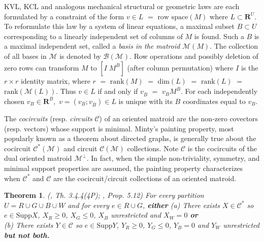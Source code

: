 \documentclass{amsproc-sunycstr}
\def\Reals{\ensuremath{\mathbf R}}
\theoremstyle{plain}
\newtheorem{theorem}{Theorem}
\theoremstyle{definition}
\theoremstyle{remark}
\newcommand{\hmat}[2]{[#1\;#2]}
\newcommand{\extra}[1]{{{#1}}}
\begin{document}
KVL, KCL and analogous mechanical structural or geometric laws 
are each formulated by a constraint of the form 
$v\in L$ $=$ $\mbox{row space}(M)$
where $L\subset\Reals^U$.  To
reformulate this law by a system of linear equations,
a maximal subset $B\subset U$ corresponding to
a linearly independent set of columns of $M$ is found.  Such a $B$ is
a maximal independent set,
called a \textit{basis in the matroid} $\mathcal{M}(M)$.
The collection of all bases in $\mathcal{M}$ is denoted by 
$\mathcal{B}(\mathcal{M})$.
Row operations and possibly deletion of zero rows can transform
$M$ to $\hmat{I}{M^{\overline{B}}}$ (after column permutation)
where $I$ is the $r\times r$ identity matrix, where $r$ $=$ 
$\mbox{rank}(M)$ $=$ $\mbox{dim}(L)$ $=$ $\mbox{rank}(L)$
$=$ $\mbox{rank}(\mathcal{M}(L))$.    
Thus $v\in L$ 
if and only if 
$v_{\overline{B}}$ $=$ $v_{B}M^{\overline{B}}$.
For each independently chosen
$v_{B}\in\Reals^B,$ $v=(v_B;v_{\overline{B}})\in L$ is unique
with its $B$ coordinates equal to $v_B$.

The \textit{cocircuits} (resp. \textit{circuits} $\mathcal{C}$)
of an oriented matroid are the non-zero covectors (resp. vectors)
whose support is minimal.  
\extra{Minty's painting property,
most popularly known as a theorem about 
directed graphs\cite{VandewalleChua}, is generally true about
the cocircuit $\mathcal{C}^*(\mathcal{M})$ and circuit 
$\mathcal{C}(\mathcal{M})$ collections.}
Note $\mathcal{C}$ is the
cocircuits of the dual oriented matroid $\mathcal{M}^\perp$.
\extra{In fact, when the 
simple non-triviality, symmetry, and minimal support properties are assumed, 
the painting property characterizes when 
$\mathcal{C}^*$ and $\mathcal{C}$ are the cocircuit/circuit collections of 
an oriented matroid.}

\extra{
\begin{theorem}
(\cite{OMBOOK}, Th. 3.4.4(4P); \cite{BachemKern}, Prop. 5.12) 
For every partition $U=R\cup G \cup B \cup W$ and for every $e\in R\cup G$,
\textbf{either} %
(a) There exists $X\in\mathcal{C}^*$ so $e\in\mbox{Supp}{X}$,
$X_R\geq 0$, $X_G\leq 0$, $X_B$ unrestricted and $X_W=0$ %
\textbf{or}\\
(b) There exists $Y\in\mathcal{C}$ so $e\in\mbox{Supp}{Y}$,
$Y_R\geq 0$, $Y_G\leq 0$, $Y_B = 0$ and $Y_W$ unrestricted %
\textbf{but not both.}
\end{theorem}
}
\end{document}
